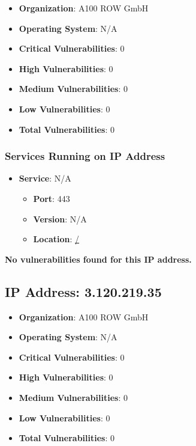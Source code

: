 \documentclass{article}
\begin{document}
\begin{itemize}
    \item \textbf{Organization}: A100 ROW GmbH
    \item \textbf{Operating System}:  N/A 
    \item \textbf{Critical Vulnerabilities}: 0
    \item \textbf{High Vulnerabilities}: 0
    \item \textbf{Medium Vulnerabilities}: 0
    \item \textbf{Low Vulnerabilities}: 0
    \item \textbf{Total Vulnerabilities}: 0
\end{itemize}

\subsubsection*{Services Running on IP Address}

\begin{itemize}
    
        \item \textbf{Service}: N/A
        \begin{itemize}
            \item \textbf{Port}: 443
            \item \textbf{Version}:  N/A 
            \item \textbf{Location}: \href{ / }{ / }
        \end{itemize}
    
\end{itemize}


\textbf{No vulnerabilities found for this IP address.}




\clearpage



\subsection{IP Address: 3.120.219.35}

\begin{itemize}
    \item \textbf{Organization}: A100 ROW GmbH
    \item \textbf{Operating System}:  N/A 
    \item \textbf{Critical Vulnerabilities}: 0
    \item \textbf{High Vulnerabilities}: 0
    \item \textbf{Medium Vulnerabilities}: 0
    \item \textbf{Low Vulnerabilities}: 0
    \item \textbf{Total Vulnerabilities}: 0
\end{itemize}
\end{document}
